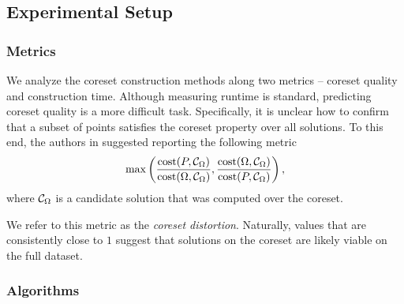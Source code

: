 \subsection{Experimental Setup}
\subsubsection{Metrics}

We analyze the coreset construction methods along two metrics -- coreset quality and construction time.  Although measuring runtime is standard, predicting coreset
quality is a more difficult task. Specifically, it is unclear how to confirm that a subset of points satisfies the coreset property over all solutions. To this
end, the authors in \cite{chrisESA} suggested reporting the following metric 
\[ \max \left( \dfrac{\operatorname{cost}(P, \mathcal C_{\Omega})}{\operatorname{cost}(\Omega, \mathcal C_{\Omega})}, \dfrac{\operatorname{cost}(\Omega, \mathcal C_{\Omega})}{\operatorname{cost}(P, \mathcal C_{\Omega})} \right),\]
where $\mathcal C_{\Omega}$ is a candidate solution that was computed over the coreset.

We refer to this metric as the \emph{coreset distortion}. Naturally, values that are consistently close to $1$ suggest that solutions on the coreset are likely
viable on the full dataset.


\subsubsection{Algorithms}
\label{ssec:algorithms}


